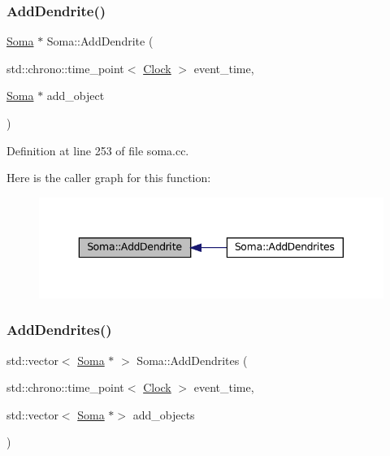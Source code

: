 \subsubsection{\texorpdfstring{Add\+Dendrite()}{AddDendrite()}}
{\footnotesize\ttfamily \mbox{\hyperlink{class_soma}{Soma}} $\ast$ Soma\+::\+Add\+Dendrite (\begin{DoxyParamCaption}\item[{std\+::chrono\+::time\+\_\+point$<$ \mbox{\hyperlink{universe_8h_a0ef8d951d1ca5ab3cfaf7ab4c7a6fd80}{Clock}} $>$}]{event\+\_\+time,  }\item[{\mbox{\hyperlink{class_soma}{Soma}} $\ast$}]{add\+\_\+object }\end{DoxyParamCaption})}



Definition at line 253 of file soma.\+cc.

Here is the caller graph for this function\+:\nopagebreak
\begin{figure}[H]
\begin{center}
\leavevmode
\includegraphics[width=343pt]{class_soma_acc198b8ec11c3f2e43d3ba9a16ce84db_icgraph}
\end{center}
\end{figure}
\mbox{\label{class_soma_a9874f03b33413b06ca74a3143cc35331}} 
\subsubsection{\texorpdfstring{Add\+Dendrites()}{AddDendrites()}}
{\footnotesize\ttfamily std\+::vector$<$ \mbox{\hyperlink{class_soma}{Soma}} $\ast$ $>$ Soma\+::\+Add\+Dendrites (\begin{DoxyParamCaption}\item[{std\+::chrono\+::time\+\_\+point$<$ \mbox{\hyperlink{universe_8h_a0ef8d951d1ca5ab3cfaf7ab4c7a6fd80}{Clock}} $>$}]{event\+\_\+time,  }\item[{std\+::vector$<$ \mbox{\hyperlink{class_soma}{Soma}} $\ast$$>$}]{add\+\_\+objects }\end{DoxyParamCaption})}



